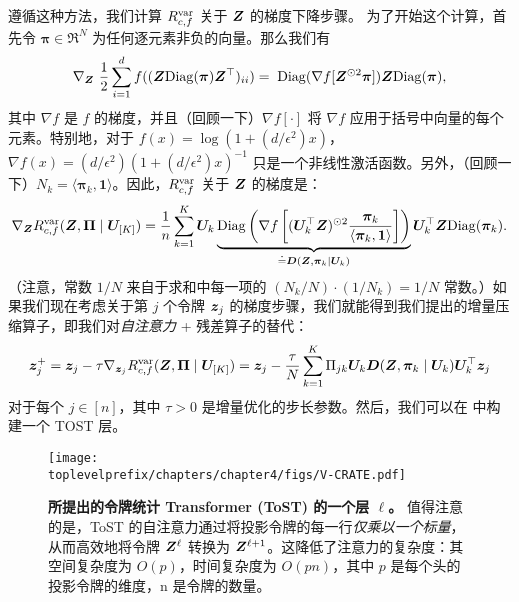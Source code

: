 \documentclass[../../book-main_zh.tex]{subfiles}
\begin{document}
遵循这种方法，我们计算 $R_{c,f}^{\rm var}$ 关于 $\bm{Z}$ 的梯度下降步骤。
为了开始这个计算，首先令 $\bm \pi \in \Re^N$ 为任何逐元素非负的向量。那么我们有
\begin{equation}\label{eq1:grad Rcf}
\nabla_{\Z} \ \frac{1}{2} \sum_{i = 1}^{d} f(  (\Z \mathrm{Diag}(\bm \pi) \Z^{\top} )_{ii}) %
= \; \mathrm{Diag}(\nabla f[ \Z^{\odot 2} \bm \pi] ) \Z \mathrm{Diag}(\bm \pi),
\end{equation}
%
其中 $\nabla f$ 是 $f$ 的梯度，并且（回顾一下）$\nabla f[\cdot]$ 将 $\nabla f$ 应用于括号中向量的每个元素。特别地，对于 $ f(x) = \log(1 + (d/\epsilon^{2}) x)$，$\nabla f(x) = (d / \epsilon^{2}) (1+ (d / \epsilon^{2}) x)^{-1}$ 只是一个非线性激活函数。另外，（回顾一下）$N_{k} = \langle \bm \pi_{k}, \bm 1\rangle$。因此，$R^{\rm var}_{c,f}$ 关于 $\bm{Z}$ 的梯度是：
\begin{align}\label{eq2:grad Rcf}
    \nabla_{\bm{Z}} R^{\rm var}_{c,f}(\bm{Z},\bm \Pi \mid \bm U_{[K]}) =  \frac{1}{n} \sum_{k=1}^K \bm U_{k} \underbrace{\mathrm{Diag} \left( \nabla f\left[ (\bm U_{k}^{\top} \bm{Z})^{\odot 2}  \frac{\bm \pi_k}{\langle \bm \pi_{k}, \bm 1\rangle} \right] \right)}_{\doteq \bm D(\bm{Z}, \bm \pi_{k} \mid \bm U_{k})} \bm U_{k}^{\top} \bm{Z} \mathrm{Diag}(\bm \pi_k).
\end{align}
（注意，常数 $1/N$ 来自于求和中每一项的 $(N_{k}/N)\cdot (1/N_{k}) = 1/N$ 常数。）如果我们现在考虑关于第 $j$ 个令牌 $\bm{z}_j$ 的梯度步骤，我们就能得到我们提出的增量压缩算子，即我们对\textit{自注意力} + 残差算子的替代：
%
\vspace{-2mm}
\begin{equation}\label{eq:layer-operation-orig}
    \bm{z}_j^+ = \bm{z}_{j} - \tau \nabla_{\bm{z}_{j}}R_{c, f}^{\rm var}(\bm{Z}, \bm \Pi \mid \bm U_{[K]}) = \bm{z}_j - \frac{\tau}{N} \sum_{k=1}^K \Pi_{jk} \bm U_{k} \bm D(\bm{Z}, \bm \pi_{k} \mid \bm U_{k}) \bm U_{k}^{\top} \bm{z}_j
\end{equation}
对于每个 \(j \in [n]\)，其中 $\tau > 0$ 是增量优化的步长参数。然后，我们可以在  中构建一个 TOST 层。

\begin{figure}[t]
    \centering \texttt{[image: \\toplevelprefix/chapters/chapter4/figs/V-CRATE.pdf]}
    \vspace{-1mm}
    \caption{\small \textbf{所提出的令牌统计 Transformer (ToST) 的一个层 $\ell$。} 值得注意的是，ToST 的自注意力通过将投影令牌的每一行\textit{仅乘以一个标量}，从而高效地将令牌 $\bm{Z}^{\ell}$ 转换为 $\bm{Z}^{\ell+1}$。这降低了注意力的复杂度：其空间复杂度为 $O(p)$，时间复杂度为 $O(pn)$，其中 $p$ 是每个头的投影令牌的维度，n 是令牌的数量。
    }
    \label{fig:vcrate-architecture}
\end{figure}
\end{document}
